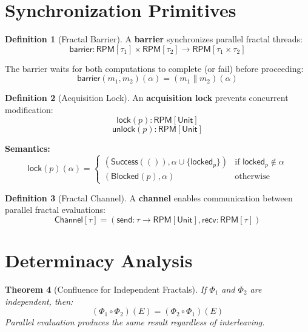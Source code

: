 \documentclass[11pt,twoside,openright]{book}
\theoremstyle{definition}
\newtheorem{definition}{Definition}[chapter]
\theoremstyle{plain}
\newtheorem{theorem}[definition]{Theorem}
\theoremstyle{remark}
\newcommand{\Frac}{\Phi}
\newcommand{\pcomp}{\parallel}
\begin{document}
\section{Synchronization Primitives}

\begin{definition}[Fractal Barrier]
\label{def:fractal-barrier}
A \textbf{barrier} synchronizes parallel fractal threads:
\[
\mathsf{barrier} : \mathsf{RPM}[\tau_1] \times \mathsf{RPM}[\tau_2] \to \mathsf{RPM}[\tau_1 \times \tau_2]
\]

The barrier waits for both computations to complete (or fail) before proceeding:
\[
\mathsf{barrier}(m_1, m_2)(\alpha) = (m_1 \pcomp m_2)(\alpha)
\]
\end{definition}

\begin{definition}[Acquisition Lock]
\label{def:acq-lock}
An \textbf{acquisition lock} prevents concurrent modification:
\[
\mathsf{lock}(p) : \mathsf{RPM}[\mathsf{Unit}]
\]
\[
\mathsf{unlock}(p) : \mathsf{RPM}[\mathsf{Unit}]
\]

\textbf{Semantics:}
\[
\mathsf{lock}(p)(\alpha) =
\begin{cases}
(\mathsf{Success}(()), \alpha \cup \{\mathsf{locked}_p\}) & \text{if } \mathsf{locked}_p \notin \alpha \\
(\mathsf{Blocked}(p), \alpha) & \text{otherwise}
\end{cases}
\]
\end{definition}

\begin{definition}[Fractal Channel]
\label{def:fractal-channel}
A \textbf{channel} enables communication between parallel fractal evaluations:
\[
\mathsf{Channel}[\tau] = (\mathsf{send} : \tau \to \mathsf{RPM}[\mathsf{Unit}], \mathsf{recv} : \mathsf{RPM}[\tau])
\]
\end{definition}

\section{Determinacy Analysis}

\begin{theorem}[Confluence for Independent Fractals]
\label{thm:parallel-confluence}
If $\Frac_1$ and $\Frac_2$ are independent, then:
\[
(\Frac_1 \circ \Frac_2)(E) = (\Frac_2 \circ \Frac_1)(E)
\]
Parallel evaluation produces the same result regardless of interleaving.
\end{theorem}
\end{document}

